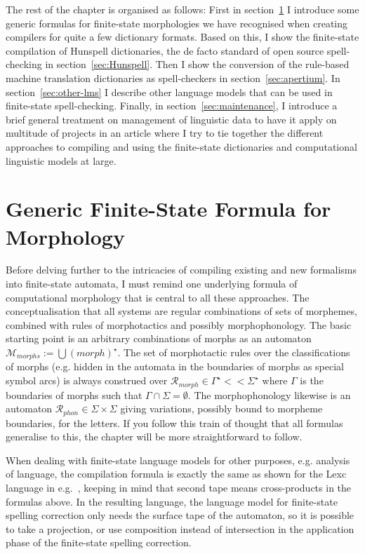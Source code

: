 \documentclass[officiallayout,draft]{unihelcompling}
\begin{document}
The rest of the chapter is organised as follows: First in
section~\ref{sec:generic} I introduce some generic formulas for finite-state
morphologies we have recognised when creating compilers for quite a few
dictionary formats. Based on this, I show the finite-state compilation of
Hunspell dictionaries, the de facto standard of open source spell-checking in
section~\ref{sec:Hunspell}.  Then I show the conversion of the rule-based
machine translation dictionaries as spell-checkers in
section~\ref{sec:apertium}. In section~\ref{sec:other-lms} I describe other
language models that can be used in finite-state spell-checking. Finally, in
section~\ref{sec:maintenance}, I introduce a brief general treatment on
management of linguistic data to have it apply on multitude of projects in an
article where I try to tie together the different approaches to compiling and
using the finite-state dictionaries and computational linguistic models at
large.

\section{Generic Finite-State Formula for Morphology}
\label{sec:generic}

Before delving further to the intricacies of compiling existing and new
formalisms into finite-state automata, I must remind one underlying formula of
computational morphology that is central to all these approaches. The
conceptualisation that all systems are regular combinations of sets of
morphemes, combined with rules of morphotactics and possibly morphophonology.
The basic starting point is an arbitrary combinations of morphs as an automaton
$\mathcal{M}_{morphs} := \bigcup ({morph})^\star$. The set of morphotactic
rules over the classifications of morphs (e.g. hidden in the automata in the
boundaries of morphs as special symbol arcs) is always construed over
$\mathcal{R}_{morph} \in \Gamma^\star << \Sigma^\star$ where $\Gamma$ is the
boundaries of morphs such that $\Gamma \cap \Sigma = \emptyset$. The
morphophonology likewise is an automaton $\mathcal{R}_{phon} \in \Sigma \times
\Sigma$ giving variations, possibly bound to morpheme boundaries, for the
letters. If you follow this train of thought that all formulas generalise to
this, the chapter will be more straightforward to follow.

When dealing with finite-state language models for other purposes, e.g.
analysis of language, the compilation formula is exactly the same as shown for
the Lexc language in e.g.~\citet{linden2009hfst}, keeping in mind that second
tape means cross-products in the formulas above. In the resulting language, the
language model for finite-state spelling correction only needs the surface tape
of the automaton, so it is possible to take a projection, or use composition
instead of intersection in the application phase of the finite-state
spelling correction.
\end{document}
